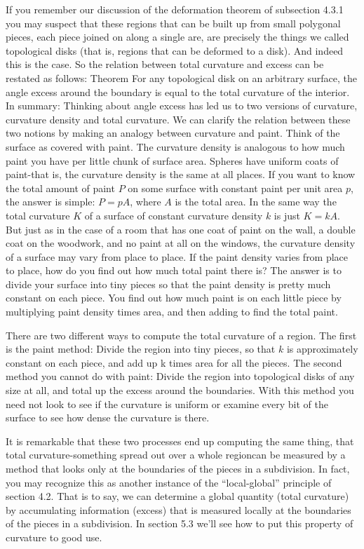 \documentclass{book}
\begin{document}
If you remember our discussion of the deformation theorem of subsection 4.3.1 you may suspect that these regions that can be built up
from small polygonal pieces, each piece joined on along a single are, are
precisely the things we called topological disks (that is, regions that can
be deformed to a disk). And indeed this is the case. So the relation
between total curvature and excess can be restated as follows:
Theorem For any topological disk on an arbitrary surface, the angle
excess around the boundary is equal to the total curvature of the interior.
In summary: Thinking about angle excess has led us to two versions
of curvature, curvature density and total curvature. We can clarify
the relation between these two notions by making an analogy between
curvature and paint. Think of the surface as covered with paint. The
curvature density is analogous to how much paint you have per little
chunk of surface area. Spheres have uniform coats of paint-that is, the
curvature density is the same at all places. If you want to know the total
amount of paint $P$ on some surface with constant paint per unit area $p$,
the answer is simple: $P = pA$, where $A$ is the total area. In the same
way the total curvature $K$ of a surface of constant curvature density $k$
is just $K = kA$. But just as in the case of a room that has one coat of
paint on the wall, a double coat on the woodwork, and no paint at all
on the windows, the curvature density of a surface may vary from place
to place. If the paint density varies from place to place, how do you
find out how much total paint there is? The answer is to divide your
surface into tiny pieces so that the paint density is pretty much constant
on each piece. You find out how much paint is on each little piece by
multiplying paint density times area, and then adding to find the total
paint.

There are two different ways to compute the total curvature of a
region. The first is the paint method: Divide the region into tiny pieces,
so that $k$ is approximately constant on each piece, and add up k times
area for all the pieces. The second method you cannot do with paint:
Divide the region into topological disks of any size at all, and total up
the excess around the boundaries. With this method you need not look
to see if the curvature is uniform or examine every bit of the surface to
see how dense the curvature is there.

It is remarkable that these two processes end up computing the same
thing, that total curvature-something spread out over a whole regioncan be measured by a method that looks only at the boundaries of
the pieces in a subdivision. In fact, you may recognize this as another
instance of the ``local-global'' principle of section 4.2. That is to say,
we can determine a global quantity (total curvature) by accumulating
information (excess) that is measured locally at the boundaries of the
pieces in a subdivision. In section 5.3 we'll see how to put this property
of curvature to good use.
\end{document}
